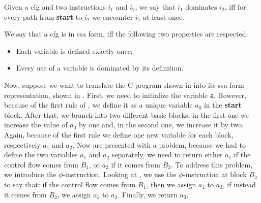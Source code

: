 \begin{definition}[Dominance]
  Given a \gls{cfg} and two instructions $i_1$ and $i_2$, we say that $i_1$ dominates $i_2$, iff for every path from \textbf{start} to $i_2$ we encounter $i_1$ at least once.
\end{definition}

\begin{definition}\label{def:ssa}
  We say that a \gls{cfg} is in \gls{ssa} form, iff the following two properties are respected:
  \begin{itemize}
    \item Each variable is defined exactly once;
    \item Every use of a variable is dominated by its definition.
  \end{itemize}
\end{definition}

Now, suppose we want to translate the C program shown in  into its \gls{ssa} form representation, shown in . First, we need to initialize the variable \texttt a. However, because of the first rule of , we define it as a unique variable $a_0$ in the \textbf{start} block. After that, we branch into two different basic blocks, in the first one we increase the value of $a_0$ by one and, in the second one, we increase it by two. Again, because of the first rule we define one new variable for each block, respectively $a_1$ and $a_2$.
Now are presented with a problem, because we had to define the two variables $a_1$ and $a_2$ separately, we need to return either $a_1$ if the control flow comes from $B_1$, or $a_2$ if it comes from $B_2$. To address this problem, we introduce the $\phi$-instruction. Looking at , we use the $\phi$-instruction at block $B_3$ to say that: if the control flow comes from $B_1$, then we assign $a_1$ to $a_3$, if instead it comes from $B_2$, we assign $a_2$ to $a_3$. Finally, we return $a_3$.

